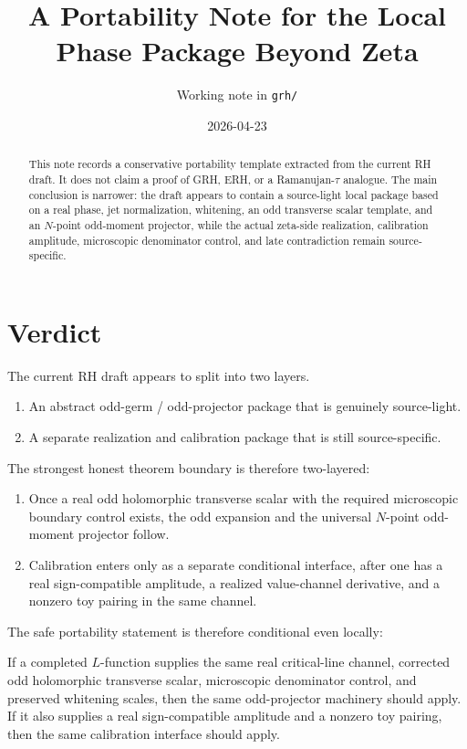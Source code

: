 \documentclass[11pt]{article}
\title{A Portability Note for the Local Phase Package Beyond Zeta}
\author{Working note in \texttt{grh/}}
\date{2026-04-23}
\begin{document}
\maketitle

\begin{abstract}
This note records a conservative portability template extracted from the current
RH draft. It does not claim a proof of GRH, ERH, or a Ramanujan-\(\tau\)
analogue. The main conclusion is narrower: the draft appears to contain a
source-light local package based on a real phase, jet normalization,
whitening, an odd transverse scalar template, and an \(N\)-point odd-moment
projector, while the actual zeta-side realization, calibration amplitude,
microscopic denominator control, and late contradiction remain source-specific.
\end{abstract}

\section{Verdict}

The current RH draft appears to split into two layers.

\begin{enumerate}
\item An abstract odd-germ / odd-projector package that is genuinely
source-light.
\item A separate realization and calibration package that is still
source-specific.
\end{enumerate}

The strongest honest theorem boundary is therefore two-layered:

\begin{enumerate}
\item Once a real odd holomorphic transverse scalar with the required
microscopic boundary control exists, the odd expansion and the universal
\(N\)-point odd-moment projector follow.
\item Calibration enters only as a separate conditional interface, after one has
a real sign-compatible amplitude, a realized value-channel derivative, and a
nonzero toy pairing in the same channel.
\end{enumerate}

The safe portability statement is therefore conditional even locally:

\medskip
\noindent
If a completed \(L\)-function supplies the same real critical-line channel,
corrected odd holomorphic transverse scalar, microscopic denominator control,
and preserved whitening scales, then the same odd-projector machinery should
apply. If it also supplies a real sign-compatible amplitude and a nonzero toy
pairing, then the same calibration interface should apply.
\medskip
\end{document}

